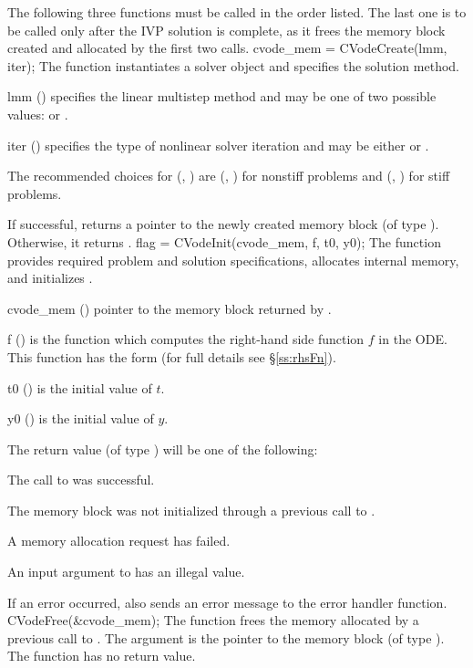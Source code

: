 The following three functions must be called in the order listed. The last one
is to be called only after the IVP solution is complete, as it frees the
{\cvodes} memory block created and allocated by the first two calls.
{
  cvode\_mem = CVodeCreate(lmm, iter);
}
{
  The function  instantiates a {\cvodes} solver object and
  specifies the solution method.
}
{
  \begin{args}[iter]
  \item[lmm] ()
    specifies the linear multistep method and may be one of two
    possible values:  or .     
  \item[iter] ()
    specifies the type of nonlinear solver iteration and may be
    either  or . 
  \end{args}
  The recommended choices for (, ) are
  (, ) for nonstiff problems and
  (, ) for stiff problems.
}
{
  If successful,  returns a pointer to the newly created 
  {\cvodes} memory block (of type ).  Otherwise, it returns .
}
{}
{
flag = CVodeInit(cvode\_mem, f, t0, y0);
}
{
  The function  provides required problem and solution
  specifications, allocates internal memory, and initializes {\cvodes}.
}
{
  \begin{args}
  \item[cvode\_mem] ()
    pointer to the {\cvodes} memory block returned by .
  \item[f] ()
    is the {\CC} function which computes the right-hand side function $f$ in the ODE.
    This function has the form  (for full details see
    \S\ref{ss:rhsFn}).
  \item[t0] ()
    is the initial value of $t$.
  \item[y0] ()
    is the initial value of $y$. 
  \end{args}
}
{
  The return value  (of type ) will be one of the following:
  \begin{args}
  \item[\Id{CV\_SUCCESS}]
    The call to  was successful.
  \item[\Id{CV\_MEM\_NULL}] 
    The {\cvodes} memory block was not initialized through a previous call
    to .
  \item[\Id{CV\_MEM\_FAIL}] 
    A memory allocation request has failed.
  \item[\Id{CV\_ILL\_INPUT}] 
    An input argument to  has an illegal value.
  \end{args}
}
{
  If an error occurred,  also sends an error message to the
  error handler function.
}
{
  CVodeFree(\&cvode\_mem);
}
{
  The function  frees the memory allocated by
  a previous call to .
}
{
  The argument is the pointer to the {\cvodes} memory block (of type ).
}
{
  The function  has no return value.
}
{}


